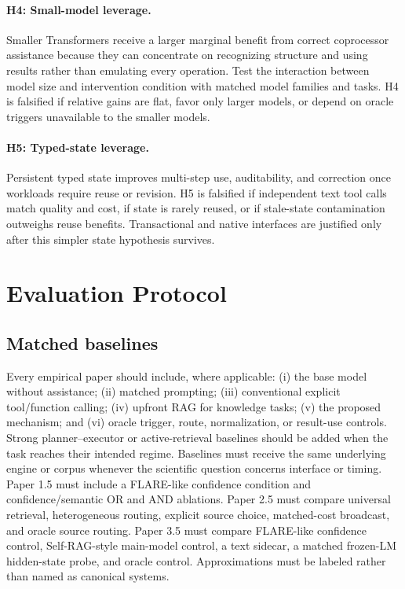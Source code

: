 \documentclass[11pt]{article}
\begin{document}
\paragraph{H4: Small-model leverage.}
Smaller Transformers receive a larger marginal benefit from correct
coprocessor assistance because they can concentrate on recognizing structure
and using results rather than emulating every operation.  Test the interaction
between model size and intervention condition with matched model families and
tasks.  H4 is falsified if relative gains are flat, favor only larger models, or
depend on oracle triggers unavailable to the smaller models.

\paragraph{H5: Typed-state leverage.}
Persistent typed state improves multi-step use, auditability, and correction
once workloads require reuse or revision.  H5 is falsified if independent text
tool calls match quality and cost, if state is rarely reused, or if stale-state
contamination outweighs reuse benefits.  Transactional and native interfaces
are justified only after this simpler state hypothesis survives.

\section{Evaluation Protocol}

\subsection{Matched baselines}

Every empirical paper should include, where applicable: (i) the base model
without assistance; (ii) matched prompting; (iii) conventional explicit
tool/function calling; (iv) upfront RAG for knowledge tasks; (v) the proposed
mechanism; and (vi) oracle trigger, route, normalization, or result-use controls.
Strong planner--executor or active-retrieval baselines should be added when the
task reaches their intended regime.  Baselines must receive the same underlying
engine or corpus whenever the scientific question concerns interface or timing.
Paper 1.5 must include a FLARE-like confidence condition and confidence/semantic
OR and AND ablations.  Paper 2.5 must compare universal retrieval, heterogeneous
routing, explicit source choice, matched-cost broadcast, and oracle source
routing.  Paper 3.5 must compare FLARE-like confidence control, Self-RAG-style
main-model control, a text sidecar, a matched frozen-LM hidden-state probe, and
oracle control.  Approximations must be labeled rather than named as canonical
systems.
\end{document}
